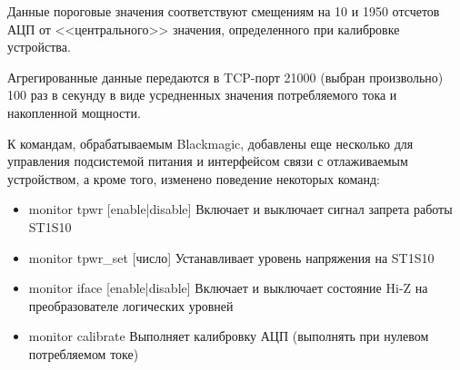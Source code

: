 Данные пороговые значения соответствуют смещениям на 10 и 1950 отсчетов АЦП 
от <<центрального>> значения, определенного при калибровке устройства.

Агрегированные данные передаются в TCP-порт 21000 (выбран произвольно) 100 раз в секунду в виде 
усредненных значения потребляемого тока и накопленной мощности.

К командам, обрабатываемым Blackmagic, добавлены еще несколько для управления подсистемой питания 
и интерфейсом связи с отлаживаемым устройством, а кроме того, изменено поведение некоторых команд:

\begin{itemize}
    \item monitor tpwr [enable|disable] Включает и выключает сигнал запрета работы ST1S10
    \item monitor tpwr\_set [число] Устанавливает уровень напряжения на ST1S10
    \item monitor iface [enable|disable] Включает и выключает состояние Hi-Z на преобразователе 
    логических уровней
    \item monitor calibrate Выполняет калибровку АЦП (выполнять при нулевом потребляемом токе)
\end{itemize}

